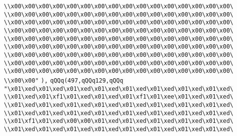 \verb|\\x00\x00\x00\x00\x00\x00\x00\x00\x00\x00\x00\x00\x00\x00\x00\x00\|\newline
\verb|\\x00\x00\x00\x00\x00\x00\x00\x00\x00\x00\x00\x00\x00\x00\x00\x00\|\newline
\verb|\\x00\x00\x00\x00\x00\x00\x00\x00\x00\x00\x00\x00\x00\x00\x00\x00\|\newline
\verb|\\x00\x00\x00\x00\x00\x00\x00\x00\x00\x00\x00\x00\x00\x00\x00\x00\|\newline
\verb|\\x00\x00\x00\x00\x00\x00\x00\x00\x00\x00\x00\x00\x00\x00\x00\x00\|\newline
\verb|\\x00\x00\x00\x00\x00\x00\x00\x00\x00\x00\x00\x00\x00\x00\x00\x00\|\newline
\verb|\\x00\x00\x00\x00\x00\x00\x00\x00\x00\x00\x00\x00\x00\x00\x00\x00\|\newline
\verb|\\x00\x00\x00\x00\x00\x00\x00\x00\x00\x00\x00\x00\x00\x00\x00\x00\|\newline
\verb|\\x00\x00\x00\x00\x00\x00\x00\x00\x00\x00\x00\x00\x00\x00\x00\x00\|\newline
\verb|\\x00\x00"|\newline
\verb|),|\newline
\verb|qQQq(497,qQQq129,qQQq|\newline
\verb|"\x01\xed\x01\xed\x01\xed\x01\xed\x01\xed\x01\xed\x01\xed\x01\xed\|\newline
\verb|\\x01\xed\x01\xf1\x01\xed\x01\xed\x01\xf1\x01\xee\x01\xed\x01\xed\|\newline
\verb|\\x01\xed\x01\xed\x01\xed\x01\xed\x01\xed\x01\xed\x01\xed\x01\xed\|\newline
\verb|\\x01\xed\x01\xed\x01\xed\x01\xed\x01\xed\x01\xed\x01\xed\x01\xed\|\newline
\verb|\\x01\xf1\x01\xed\x00\x00\x01\xed\x01\xed\x01\xed\x01\xed\x01\xed\|\newline
\verb|\\x01\xed\x01\xed\x01\xed\x01\xed\x01\xed\x01\xed\x01\xed\x01\xed\|\newline
